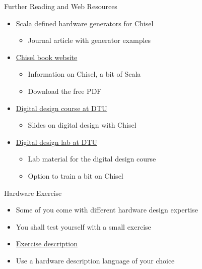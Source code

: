 \begin{frame}[fragile]{Further Reading and Web Resources}
\begin{itemize}
\item \href{https://www.sciencedirect.com/science/article/pii/S014193312500050X}{Scala defined hardware generators for Chisel}
\begin{itemize}
\item Journal article with generator examples
\end{itemize}
\item \href{http://www.imm.dtu.dk/~masca/chisel-book.html}{Chisel book website}
\begin{itemize}
\item Information on Chisel, a bit of Scala
\item Download the free PDF
\end{itemize}
\item \href{http://www2.imm.dtu.dk/courses/02139/}{Digital design course at DTU}
\begin{itemize}
\item Slides on digital design with Chisel
\end{itemize}
\item \href{https://github.com/schoeberl/chisel-lab}{Digital design lab at DTU}
\begin{itemize}
\item Lab material for the digital design course
\item Option to train a bit on Chisel
\end{itemize}
\end{itemize}
\end{frame}

\begin{frame}[fragile]{Hardware Exercise}
\begin{itemize}
\item Some of you come with different hardware design expertise
\item You shall test yourself with a small exercise
\item \href{https://github.com/schoeberl/agile-hw/blob/main/background-exercise.md}{Exercise description}
\item Use a hardware description language of your choice
\end{itemize}
\end{frame}

